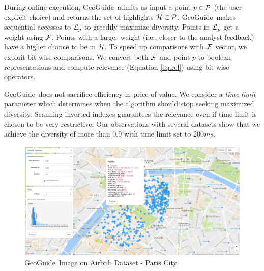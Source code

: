 \documentclass[conference,compsoc]{IEEEtran}
\newcommand{\framework}{{\sc GeoGuide}}
\begin{document}
During online execution, \framework\ admits as input a point $p \in {\cal P}$ (the user explicit choice) and returns the set of highlights ${\cal H} \subset {\cal P}$. \framework\ makes sequential accesses to ${\cal L}_p$ to greedily maximize diversity. Points in ${\cal L}_p$ get a weight using ${\cal F}$. Points with a larger weight (i.e., closer to the analyst feedback) have a higher chance to be in ${\cal H}$. To speed up comparisons with ${\cal F}$ vector, we exploit bit-wise comparisons. We convert both ${\cal F}$ and point $p$ to boolean representations and compute relevance (Equation \ref{eq:rel}) using bit-wise operators.

\framework\ does not sacrifice efficiency in price of value. We consider a {\em time limit} parameter which determines when the algorithm should stop seeking maximized diversity. Scanning inverted indexes guarantees the relevance even if time limit is chosen to be very restrictive. Our observations with several datasets show that we achieve the diversity of more than $0.9$ with time limit set to $200ms$.

\begin{figure}[t]
	\centering
	\includegraphics[width=\textwidth, frame]{figs/airbnb}
	\caption{\framework\ Image on Airbnb Dataset - Paris City}
	\label{fig:airbnb}
	\vspace{-10pt}
\end{figure}


\end{document}
